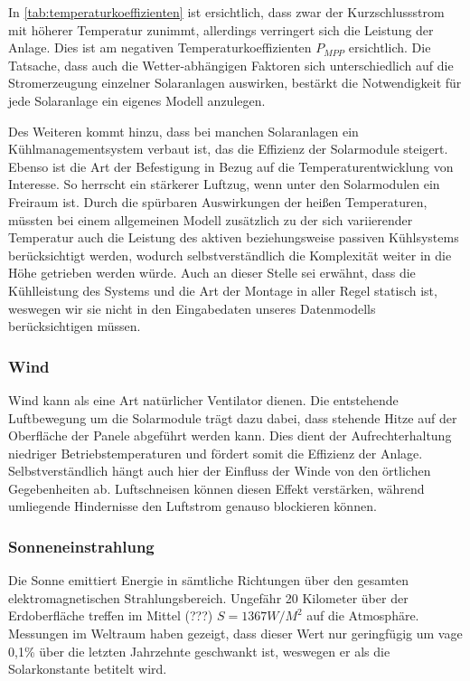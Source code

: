 \documentclass[12pt, a4paper]{article}
\begin{document}

In \autoref{tab:temperaturkoeffizienten} ist ersichtlich, dass zwar der Kurzschlussstrom mit höherer Temperatur zunimmt, allerdings verringert sich die Leistung der Anlage. Dies ist am negativen Temperaturkoeffizienten $P_{MPP}$ ersichtlich. Die Tatsache, dass auch die Wetter-abhängigen Faktoren sich unterschiedlich auf die Stromerzeugung einzelner Solaranlagen auswirken, bestärkt die Notwendigkeit für jede Solaranlage ein eigenes Modell anzulegen.

Des Weiteren kommt hinzu, dass bei manchen Solaranlagen ein Kühlmanagementsystem verbaut ist, das die Effizienz der Solarmodule steigert. Ebenso ist die Art der Befestigung in Bezug auf die Temperaturentwicklung von Interesse. So herrscht ein stärkerer Luftzug, wenn unter den Solarmodulen ein Freiraum ist. Durch die spürbaren Auswirkungen der heißen Temperaturen, müssten bei einem allgemeinen Modell zusätzlich zu der sich variierender Temperatur auch die Leistung des aktiven beziehungsweise passiven Kühlsystems berücksichtigt werden, wodurch selbstverständlich die Komplexität weiter in die Höhe getrieben werden würde. Auch an dieser Stelle sei erwähnt, dass die Kühlleistung des Systems und die Art der Montage in aller Regel statisch ist, weswegen wir sie nicht in den Eingabedaten unseres Datenmodells berücksichtigen müssen.

\subsubsection{Wind}

Wind kann als eine Art natürlicher Ventilator dienen. Die entstehende Luftbewegung um die Solarmodule trägt dazu dabei, dass stehende Hitze auf der Oberfläche der Panele abgeführt werden kann. Dies dient der Aufrechterhaltung niedriger Betriebstemperaturen und fördert somit die Effizienz der Anlage. Selbstverständlich hängt auch hier der Einfluss der Winde von den örtlichen Gegebenheiten ab. Luftschneisen können diesen Effekt verstärken, während umliegende Hindernisse den Luftstrom genauso blockieren können.

\subsubsection{Sonneneinstrahlung}

Die Sonne emittiert Energie in sämtliche Richtungen über den gesamten elektromagnetischen Strahlungsbereich. Ungefähr 20 Kilometer über der Erdoberfläche treffen im Mittel (???) $S = 1367 W/M^2$ auf die Atmosphäre. Messungen im Weltraum haben gezeigt, dass dieser Wert nur geringfügig um vage 0,1\% über die letzten Jahrzehnte geschwankt ist, weswegen er als die Solarkonstante betitelt wird. 
\end{document}
